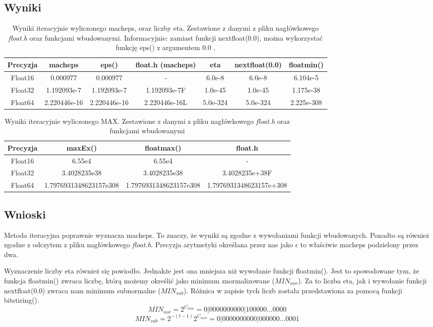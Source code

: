 \documentclass[]{article}
\begin{document}
\subsection{Wyniki}
\begin{table}[h]
	\centering
	\begin{tabular}{||c c c c c c c||} 
		\hline
		Precyzja & macheps & eps() & float.h (macheps) & eta & nextfloat(0.0) & floatmin()\\ [0.5ex] 
		\hline\hline
		Float16 & 0.000977 & 0.000977 & - & 6.0e-8 & 6.0e-8 & 6.104e-5\\ 
		Float32 & 1.192093e-7 & 1.192093e-7 & 1.192093e-7F & 1.0e-45 & 1.0e-45 & 1.175e-38\\
		Float64 & 2.220446e-16 & 2.220446e-16 & 2.220446e-16L & 5.0e-324 & 5.0e-324 & 2.225e-308\\
		\hline
	\end{tabular}
	\caption{Wyniki iteracyjnie wyliczonego macheps, oraz liczby eta. Zestawione z danymi z pliku nagłówkowego \textit{float.h} oraz funkcjami wbudowanymi. Informacyjnie: zamiast funkcji nextfloat(0.0), można wykorzystać funkcję eps() z argumentem 0.0 .}
\end{table}
\begin{table}[h]
	\centering
	\begin{tabular}{||c c c c||} 
		\hline
		Precyzja & maxEx() & floatmax() & float.h \\ [0.5ex] 
		\hline\hline
		Float16 & 6.55e4 & 6.55e4 & - \\ 
		Float32 & 3.4028235e38 & 3.4028235e38 &  3.4028235e+38F\\
		Float64 & 1.7976931348623157e308 & 1.7976931348623157e308 & 1.7976931348623157e+308 \\
		\hline
	\end{tabular}
	\caption{Wyniki iteracyjnie wyliczonego MAX. Zestawione z danymi z pliku nagłówkowego \textit{float.h} oraz funkcjami wbudowanymi}
\end{table}
\subsection{Wnioski}
Metoda iteracyjna poprawnie wyznacza macheps. To znaczy, że wyniki są zgodne z wywołaniami funkcji wbudowanych. Ponadto są również zgodne z odczytem z pliku nagłówkowego \textit{float.h}. Precyzja arytmetyki określana przez nas jako $\epsilon$ to właściwie macheps podzielony przez dwa.

Wyznaczenie liczby eta również się powiodło. Jednakże jest ona mniejsza niż wywołanie funkcji floatmin(). Jest to spowodowane tym, że funkcja floatmin() zwraca liczbę, którą możemy określić jako minimum znormalizowane (\(MIN_{\textit{nor}}\)). Za to liczba eta, jak i wywołanie funkcji nextfloat(0.0) zwraca nam minimum subnormalne (\(MIN_{\textit{sub}}\)). Różnica w zapisie tych liczb została przedstawiona za pomocą funkcji bitstiring().
\[ MIN_{\textit{nor}} = 2^{C_{min}} = 0|0000000000|100000...0000\]
\[ MIN_{\textit{sub}} = 2^{-(t-1)}2^{C_{min}} = 0|0000000000|000000...0001\]
 
\end{document}
